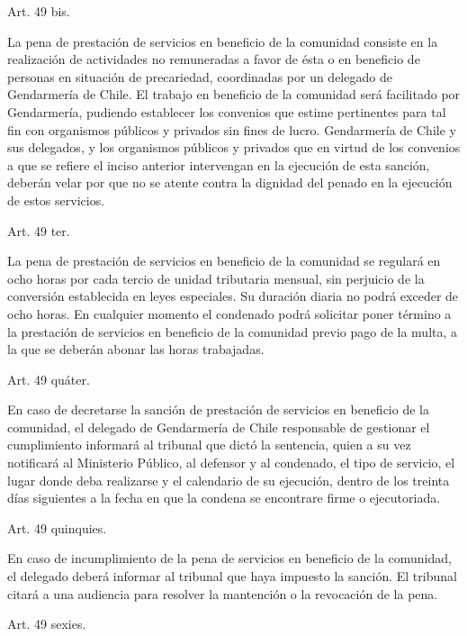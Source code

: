     Art. 49 bis.

    La pena de prestación de servicios en beneficio de la comunidad consiste en la realización de actividades no remuneradas a favor de ésta o en beneficio de personas en situación de precariedad, coordinadas por un delegado de Gendarmería de Chile.
    El trabajo en beneficio de la comunidad será facilitado por Gendarmería, pudiendo establecer los convenios que estime pertinentes para tal fin con organismos públicos y privados sin fines de lucro.
    Gendarmería de Chile y sus delegados, y los organismos públicos y privados que en virtud de los convenios a que se refiere el inciso anterior intervengan en la ejecución de esta sanción, deberán velar por que no se atente contra la dignidad del penado en la ejecución de estos servicios.


    Art. 49 ter.

    La pena de prestación de servicios en beneficio de la comunidad se regulará en ocho horas por cada tercio de unidad tributaria mensual, sin perjuicio de la conversión establecida en leyes especiales.
    Su duración diaria no podrá exceder de ocho horas.
    En cualquier momento el condenado podrá solicitar poner término a la prestación de servicios en beneficio de la comunidad previo pago de la multa, a la que se deberán abonar las horas trabajadas.



    Art. 49 quáter.

    En caso de decretarse la sanción de prestación de servicios en beneficio de la comunidad, el delegado de Gendarmería de Chile responsable de gestionar el cumplimiento informará al tribunal que dictó la sentencia, quien a su vez notificará al Ministerio Público, al defensor y al condenado, el tipo de servicio, el lugar donde deba realizarse y el calendario de su ejecución, dentro de los treinta días siguientes a la fecha en que la condena se encontrare firme o ejecutoriada.


    Art. 49 quinquies.

    En caso de incumplimiento de la pena de servicios en beneficio de la comunidad, el delegado deberá informar al tribunal que haya impuesto la sanción.
    El tribunal citará a una audiencia para resolver la mantención o la revocación de la pena.



    Art. 49 sexies.

